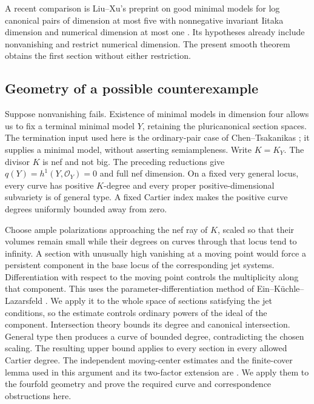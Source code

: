 A recent comparison is Liu--Xu's preprint on good minimal models for
log canonical pairs of dimension at most five with nonnegative
invariant Iitaka dimension and numerical dimension at most one
\cite[Theorem~5.1]{LiuXu2025}. Its hypotheses already include
nonvanishing and restrict numerical dimension. The present smooth
theorem obtains the first section without either restriction.

\subsection*{Geometry of a possible counterexample}

Suppose nonvanishing fails. Existence of minimal models in dimension
four allows us to fix a terminal minimal model $Y$, retaining the
pluricanonical section spaces. The termination input used here is the
ordinary-pair case of Chen--Tsakanikas
\cite[Theorem 1.1]{ChenTsakanikas2023}; it supplies a minimal model,
without asserting semiampleness. Write $K=K_Y$. The divisor $K$ is nef
and not big. The preceding reductions give $q(Y)=h^1(Y,\mathcal O_Y)=0$
and full nef dimension. On a fixed very general locus, every curve has
positive $K$-degree and every proper positive-dimensional subvariety is
of general type. A fixed Cartier index makes the positive curve degrees
uniformly bounded away from zero.

Choose ample polarizations approaching the nef ray of $K$, scaled so
that their volumes remain small while their degrees on curves through
that locus tend to infinity. A section with unusually high vanishing
at a moving point would force a persistent component in the base locus
of the corresponding jet systems. Differentiation with respect to the
moving point controls the multiplicity along that component. This uses
the parameter-differentiation method of Ein--K\"uchle--Lazarsfeld
\cite[Proposition 2.3]{EinKuchleLazarsfeld1995}. We apply it to the
whole space of sections satisfying the jet conditions, so the estimate
controls ordinary powers of the ideal of the component. Intersection
theory bounds its degree and canonical intersection. General type then
produces a curve of bounded degree, contradicting the chosen scaling.
The resulting upper bound applies to every section in every allowed
Cartier degree.
The independent moving-center estimates and the finite-cover lemma
used in this argument and its two-factor extension are
\cite[Lemmas~7.1--7.5]{OpenAIAbundance2026}. We apply them to the
fourfold geometry and prove the required curve and correspondence
obstructions here.

